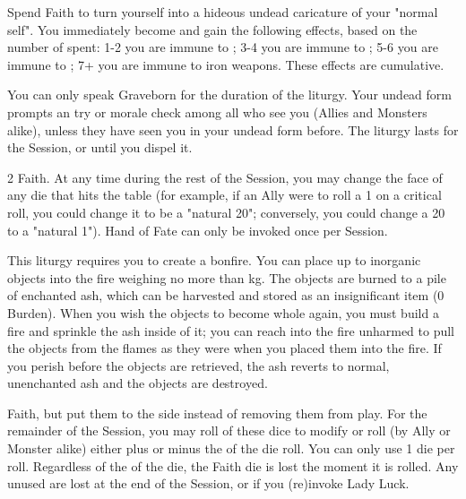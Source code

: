\begin{multicols*}{2}
\LITURGY [
  Name = Gory Locks,
  Link = arcana-mystery-gory-locks,
  Paradigm = Monstrous
]

Spend \DICE Faith to turn yourself into a hideous undead caricature of your "normal self".  You immediately become  and gain the following effects, based on the number of \DICE spent:  1-2 you are immune to ; 3-4 you are immune to ; 5-6 you are immune to ; 7+  you are immune to iron weapons.  These effects are cumulative.

You can only speak Graveborn for the duration of the liturgy.  Your undead form prompts an \INSANITY try or morale check among all who see you (Allies and Monsters alike), unless they have seen you in your undead form before. The liturgy lasts for the Session, or until you dispel it. 

\LITURGY [
  Name = Hand of Fate,
  Link = arcana-mystery-hand-of-fate,
  Paradigm = Ruinous
]

 2 Faith. At any time during the rest of the Session, you may change the face of any die that hits the table (for example, if an Ally were to roll a 1 on a critical roll, you could change it to be a "natural 20"; conversely, you could change a 20 to a "natural 1"). Hand of Fate can only be invoked once per Session. 

\LITURGY [
  Name = Incinerate,
  Link = arcana-mystery-incinerate,
  Paradigm = J{\UmlautO}tnar
]

This liturgy requires you to create a bonfire.  You can place up to \DICE inorganic objects into the fire weighing no more than \SUMDICE kg.  The objects are burned to a pile of enchanted ash, which can be harvested and stored as an insignificant item (0 Burden).  When you wish the objects to become whole again, you must build a fire and sprinkle the ash inside of it; you can reach into the fire unharmed to pull the objects from the flames as they were when you placed them into the fire.  If you perish before the objects are retrieved, the ash reverts to normal, unenchanted ash and the objects are destroyed.


\LITURGY [
  Name = Lady Luck,
  Link = arcana-lady-luck,
  Paradigm = Errant
]

 \DICE Faith, but put them to the side instead of removing them from play. For the remainder of the Session, you may roll  of these dice to modify  \RO or \RB roll (by Ally or Monster alike) either plus or minus the \SUMDICE of the die roll.  You can only use 1 die per roll.  Regardless of the \SUMDICE of the die, the Faith die is lost the moment it is rolled.  Any unused \DICE are lost at the end of the Session, or if you (re)invoke Lady Luck.



\end{multicols*}
